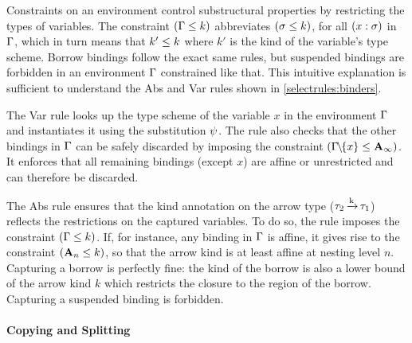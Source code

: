 
Constraints on an environment control substructural properties by
restricting the types of variables.  The constraint $(\Gamma \leq k)$
abbreviates $(\sigma \leq k)$, for all $(x : \sigma)$
in $\Gamma$, which in turn means that $k' \leq k$ where $k'$ is the kind of
the variable's type scheme.
Borrow bindings follow the exact same rules, but suspended bindings
are forbidden in an environment $\Gamma$ constrained like that.
This intuitive explanation is sufficient to understand
the {\sc Abs} and {\sc Var} rules shown in
\cref{selectrules:binders}.

The {\sc Var} rule looks up the type scheme of the variable $x$ in
the environment $\Gamma$
and instantiates it using the substitution $\mathrm{\psi}$. The rule also
checks that the other bindings in $\Gamma$ can be safely discarded by
imposing the constraint $(\Gamma\!\!\mathbin{\setminus}\!\!\{x\} \leq \mathbf{A}_\infty)$.
It enforces that all remaining bindings (except $x$) are affine or
unrestricted and can therefore be discarded.

The {\sc Abs} rule ensures that the kind annotation on the arrow type
($\tau_2 \operatorname{\xrightarrow{k}} \tau_1$) reflects the restrictions on the captured variables.
To do so, the rule imposes the constraint $(\Gamma \leq k)$.
If, for instance, any binding in $\Gamma$ is affine, it gives rise to the
constraint $(\mathbf{A}_n \leq k)$, so that  the arrow kind is at least
affine at nesting level $n$.
Capturing a borrow is perfectly fine: the kind of the borrow is also a
lower bound of the arrow kind $k$ which restricts the closure
to the region of the borrow.
Capturing a suspended binding is forbidden.




\paragraph{Copying and Splitting}
\label{sdtyping:split}


